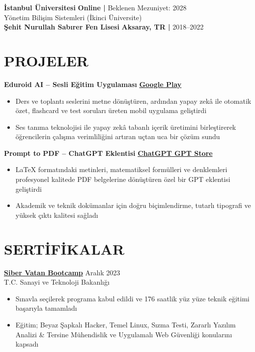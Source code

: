 \documentclass[11pt]{article}       %
\begin{document}
\textbf{İstanbul Üniversitesi} \hfill \textbf{Online |} Beklenen Mezuniyet: 2028 \\
Yönetim Bilişim Sistemleri (İkinci Üniversite) \\[6pt]

\textbf{Şehit Nurullah Sabırer Fen Lisesi} \hfill \textbf{Aksaray, TR |} 2018--2022


\vspace{-6.5pt}

\section*{PROJELER}

\textbf{Eduroid AI -- Sesli Eğitim Uygulaması} \hfill
\href{https://play.google.com/store/apps/dev?id=8414973691889516106}{\textbf{Google Play}} \\
\vspace{-9pt}
\begin{itemize}
  \item Ders ve toplantı seslerini metne dönüştüren, ardından yapay zekâ ile otomatik özet, flashcard ve test soruları üreten mobil uygulama geliştirdi
  \item Ses tanıma teknolojisi ile yapay zekâ tabanlı içerik üretimini birleştirerek öğrencilerin çalışma verimliliğini artıran uçtan uca bir çözüm sundu
\end{itemize}

\textbf{Prompt to PDF -- ChatGPT Eklentisi} \hfill
\href{https://chatgpt.com/g/g-6790c6ff33988191a78371fbc1267981-prompt-to-pdf}{\textbf{ChatGPT GPT Store}} \\
\vspace{-9pt}
\begin{itemize}
  \item LaTeX formatındaki metinleri, matematiksel formülleri ve denklemleri profesyonel kalitede PDF belgelerine dönüştüren özel bir GPT eklentisi geliştirdi
  \item Akademik ve teknik dokümanlar için doğru biçimlendirme, tutarlı tipografi ve yüksek çıktı kalitesi sağladı
\end{itemize}


\vspace{-6.5pt}

\section*{SERTİFİKALAR}
\textbf{\href{https://drive.google.com/file/d/1SBd8-eo2GcmsAc0Q561PigSK4FLun7_R/view?usp=sharing}{Siber Vatan Bootcamp}} \hfill Aralık 2023 \\
T.C. Sanayi ve Teknoloji Bakanlığı \\
\vspace{-9pt}
\begin{itemize}
  \item Sınavla seçilerek programa kabul edildi ve 176 saatlik yüz yüze teknik eğitimi başarıyla tamamladı
  \item Eğitim; Beyaz Şapkalı Hacker, Temel Linux, Sızma Testi, Zararlı Yazılım Analizi \& Tersine Mühendislik ve Uygulamalı Web Güvenliği konularını kapsadı
\end{itemize}
\end{document}
